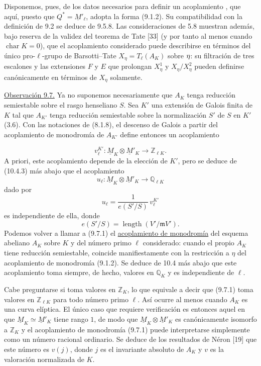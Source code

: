 Disponemos, pues, de los datos necesarios para definir un acoplamiento
, que aquí, puesto que
$Q^*=\underline M'_\ell$, adopta la forma (9.1.2). Su compatibilidad
con la definición de 9.2 se deduce de 9.5.8. Las consideraciones de
5.8 muestran además, bajo reserva de la validez del teorema de Tate
[33] (y por tanto al menos cuando $\operatorname{char}K=0$), que el
acoplamiento considerado puede describirse en términos del único
pro-$\ell$-grupo de Barsotti--Tate $X_\eta=T_\ell(A_K)$ sobre
$\sisi{S}{\eta}$: su filtración de tres escalones y las extensiones
$F$ y $E$ que prolongan $X^1_\eta$ y $X_\eta/X^2_\eta$ pueden
definirse canónicamente en términos de $X_\eta$ solamente.

\medskip
\noindent
\underline{Observación 9.7.} Ya no suponemos necesariamente que $A_K$
tenga reducción semiestable sobre el rasgo henseliano $S$. Sea $K'$
una extensión de Galois finita de $K$ tal que $A_{K'}$ tenga reducción
semiestable sobre la normalización $S'$ de $S$ en $K'$ (3.6). Con las
notaciones de (8.1.8), el descenso de Galois a partir del acoplamiento
de monodromía de $A_{K'}$ define entonces un acoplamiento


\begin{equation}\tag{*}
v_\ell^{K'}:\underline M_K\otimes\underline M'_K
 \longrightarrow\mathbb Z_{\ell K}.
\end{equation}
A priori, este acoplamiento depende de la elección de $K'$, pero se
deduce de (10.4.3) más abajo que el acoplamiento
\begin{equation}\tag{9.7.1}
u_\ell:\underline M_K\otimes\underline M'_K
 \longrightarrow\mathbb Q_{\ell K}
\end{equation}
dado por
\begin{equation*}
u_\ell=\frac{1}{e(S'/S)}\,v_\ell^{K'}
\end{equation*}
es independiente de ella, donde
\begin{equation*}
e(S'/S)=\operatorname{length}(V'/\mathfrak mV').
\end{equation*}
Podemos volver a llamar a (9.7.1) el \underline{acoplamiento de
monodromía} del esquema abeliano $A_K$ sobre $K$ y del número primo
$\ell$ considerado: cuando el propio $A_K$ tiene reducción
semiestable, coincide manifiestamente con la restricción a $\eta$ del
acoplamiento de monodromía (9.1.2). Se deduce de 10.4 más abajo que este
acoplamiento toma siempre, de hecho, valores en $\mathbb Q_K$ y es
independiente de $\ell$.

Cabe preguntarse si toma valores en $\mathbb Z_K$, lo que equivale a
decir que (9.7.1) toma valores en $\mathbb Z_{\ell K}$ para todo
número primo $\ell$. Así ocurre al menos cuando $A_K$ es una curva
elíptica. El único caso que requiere verificación es entonces aquel en
que $\underline M_K\simeq\underline M'_K$ tiene rango $1$, de modo que
$\underline M_K\otimes\underline M'_K$ es canónicamente isomorfo a
$\mathbb Z_K$ y el acoplamiento de monodromía (9.7.1) puede
interpretarse simplemente como un número racional ordinario. Se
deduce de los resultados de Néron [19] que este número es $v(j)$,
donde $j$ es el invariante absoluto de $A_K$ y $v$ es la valoración
normalizada de $K$.
